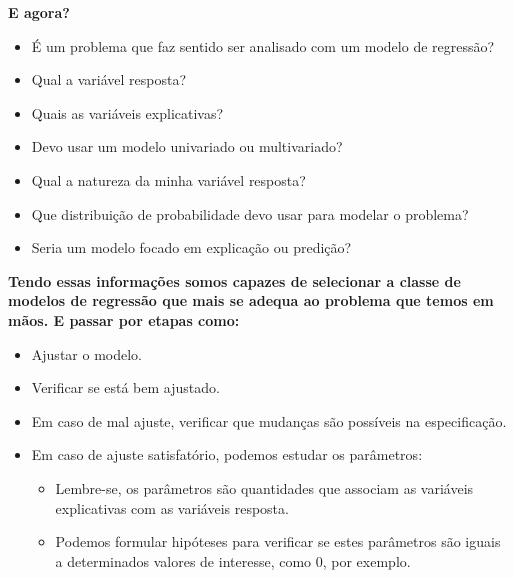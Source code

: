 \documentclass[10pt,
  aspectratio=169,
  serif,
  mathserif,
  professionalfont,
  compress,
  handout,
  ]{beamer}\usepackage[]{graphicx}\usepackage[]{color}
\begin{document}
\begin{frame}[c, allowframebreaks]

\textbf{E agora?}

\begin{itemize}

  \item É um problema que faz sentido ser analisado com um modelo de regressão?

  \item Qual a variável resposta?

  \item Quais as variáveis explicativas?

  \item Devo usar um modelo univariado ou multivariado?

  \item Qual a natureza da minha variável resposta?
  
  \item Que distribuição de probabilidade devo usar para modelar o problema?
  
  \item Seria um modelo focado em explicação ou predição?

\end{itemize}

\end{frame}

\begin{frame}[c, allowframebreaks]

\textbf{Tendo essas informações somos capazes de selecionar a classe de modelos de regressão que mais se adequa ao problema que temos em mãos. E passar por etapas como:}

\begin{itemize}

  \item Ajustar o modelo.

  \item Verificar se está bem ajustado.

  \item Em caso de mal ajuste, verificar que mudanças são possíveis na especificação.

  \item Em caso de ajuste satisfatório, podemos estudar os parâmetros:
  
  \begin{itemize}
    
    \item Lembre-se, os parâmetros são quantidades que associam as variáveis explicativas com as variáveis resposta.
    
    \item Podemos formular hipóteses para verificar se estes parâmetros são iguais a determinados valores de interesse, como 0, por exemplo.
    
  \end{itemize}

\end{itemize}

\end{frame}
\end{document}
